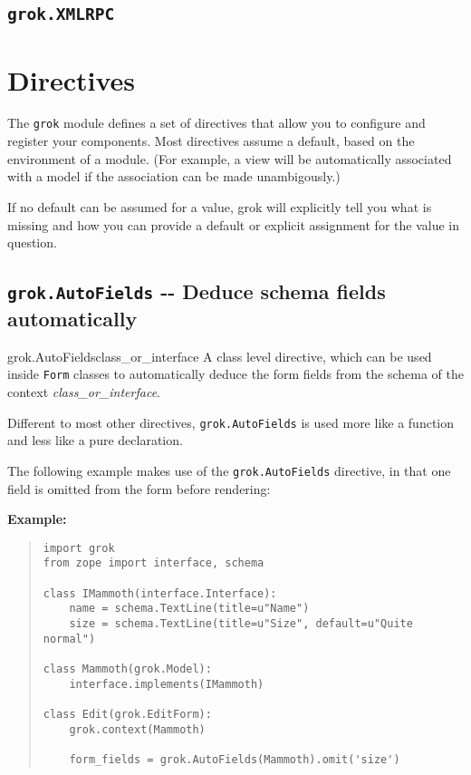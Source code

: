 \documentclass[10pt,a4paper,english]{manual}
\newcommand{\titlereference}[1]{\textsl{#1}}
\begin{document}

\section{\texttt{grok.XMLRPC}}



\chapter{Directives}

The \texttt{grok} module defines a set of directives that allow you to configure
and register your components. Most directives assume a default, based on the
environment of a module. (For example, a view will be automatically associated
with a model if the association can be made unambigously.)

If no default can be assumed for a value, grok will explicitly tell you what is
missing and how you can provide a default or explicit assignment for the value
in question.



\section{\texttt{grok.AutoFields} -{}- Deduce schema fields automatically}
\begin{funcdesc}{grok.AutoFields}{class{\_}or{\_}interface}
A class level directive, which can be used inside \texttt{Form}
classes to automatically deduce the form fields from the schema of
the context \titlereference{class{\_}or{\_}interface}.

Different to most other directives, \texttt{grok.AutoFields} is used
more like a function and less like a pure declaration.

The following example makes use of the \texttt{grok.AutoFields}
directive, in that one field is omitted from the form before
rendering:
\end{funcdesc}

\textbf{Example:}
\begin{quote}\begin{verbatim}
import grok
from zope import interface, schema

class IMammoth(interface.Interface):
    name = schema.TextLine(title=u"Name")
    size = schema.TextLine(title=u"Size", default=u"Quite normal")

class Mammoth(grok.Model):
    interface.implements(IMammoth)

class Edit(grok.EditForm):
    grok.context(Mammoth)

    form_fields = grok.AutoFields(Mammoth).omit('size')
\end{verbatim}\end{quote}
\end{document}
